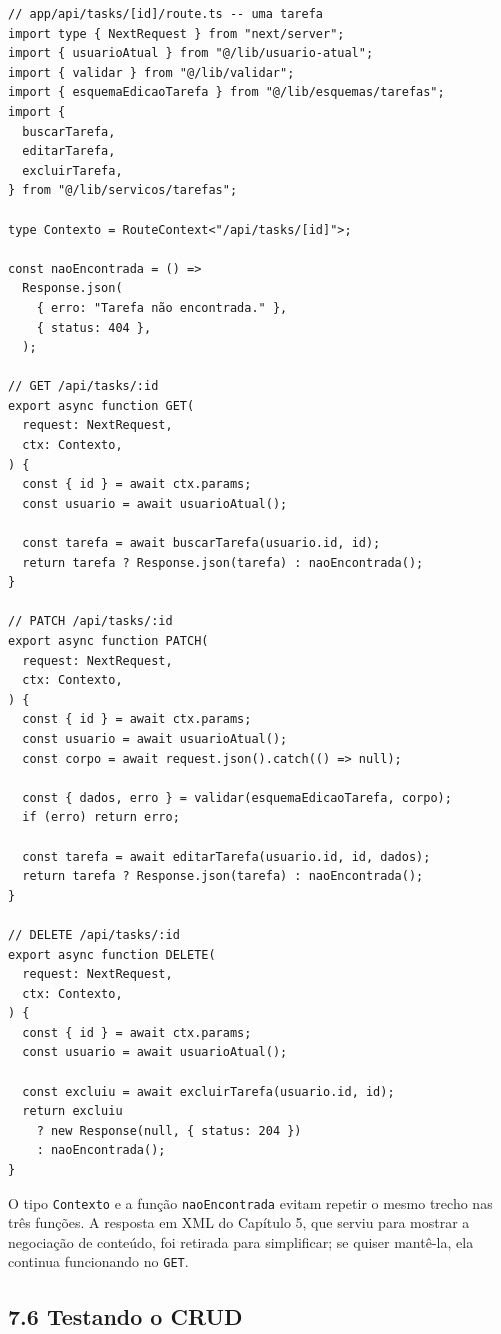 \begin{codigo}
\begin{Verbatim}[breaklines=true, breaksymbolleft={}, fontsize=\footnotesize]
// app/api/tasks/[id]/route.ts -- uma tarefa
import type { NextRequest } from "next/server";
import { usuarioAtual } from "@/lib/usuario-atual";
import { validar } from "@/lib/validar";
import { esquemaEdicaoTarefa } from "@/lib/esquemas/tarefas";
import {
  buscarTarefa,
  editarTarefa,
  excluirTarefa,
} from "@/lib/servicos/tarefas";

type Contexto = RouteContext<"/api/tasks/[id]">;

const naoEncontrada = () =>
  Response.json(
    { erro: "Tarefa não encontrada." },
    { status: 404 },
  );

// GET /api/tasks/:id
export async function GET(
  request: NextRequest,
  ctx: Contexto,
) {
  const { id } = await ctx.params;
  const usuario = await usuarioAtual();

  const tarefa = await buscarTarefa(usuario.id, id);
  return tarefa ? Response.json(tarefa) : naoEncontrada();
}

// PATCH /api/tasks/:id
export async function PATCH(
  request: NextRequest,
  ctx: Contexto,
) {
  const { id } = await ctx.params;
  const usuario = await usuarioAtual();
  const corpo = await request.json().catch(() => null);

  const { dados, erro } = validar(esquemaEdicaoTarefa, corpo);
  if (erro) return erro;

  const tarefa = await editarTarefa(usuario.id, id, dados);
  return tarefa ? Response.json(tarefa) : naoEncontrada();
}

// DELETE /api/tasks/:id
export async function DELETE(
  request: NextRequest,
  ctx: Contexto,
) {
  const { id } = await ctx.params;
  const usuario = await usuarioAtual();

  const excluiu = await excluirTarefa(usuario.id, id);
  return excluiu
    ? new Response(null, { status: 204 })
    : naoEncontrada();
}
\end{Verbatim}
\end{codigo}

O tipo \texttt{Contexto} e a função \texttt{naoEncontrada} evitam repetir o mesmo trecho nas três funções. A resposta em XML do Capítulo 5, que serviu para mostrar a negociação de conteúdo, foi retirada para simplificar; se quiser mantê-la, ela continua funcionando no \texttt{GET}.

\subsection{7.6 Testando o CRUD}

